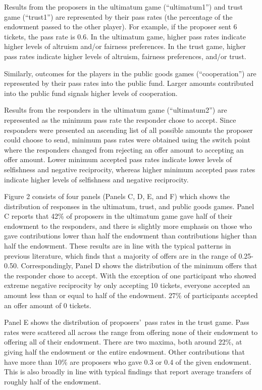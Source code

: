 \documentclass[12pt]{article}
\begin{document}
Results from the proposers in the ultimatum game (``ultimatum1'') and trust game (``trust1'') are represented by their pass rates (the percentage of the endowment passed to the other player). For example, if the proposer sent 6 tickets, the pass rate is 0.6. In the ultimatum game, higher pass rates indicate higher levels of altruism and/or fairness preferences. In the trust game, higher pass rates indicate higher levels of altruism, fairness preferences, and/or trust. 

Similarly, outcomes for the players in the public goods games (``cooperation'') are represented by their pass rates into the public fund. Larger amounts contributed into the public fund signals higher levels of cooperation.

Results from the responders in the ultimatum game (``ultimatum2'') are represented as the minimum pass rate the responder chose to accept. Since responders were presented an ascending list of all possible amounts the proposer could choose to send, minimum pass rates were obtained using the switch point where the responders changed from rejecting an offer amount to accepting an offer amount. Lower minimum accepted pass rates indicate lower levels of selfishness and negative reciprocity, whereas higher minimum accepted pass rates indicate higher levels of selfishness and negative reciprocity.

Figure 2 consists of four panels (Panels C, D, E, and F) which shows the distribution of responses in the ultimatum, trust, and public goods games. Panel C reports that 42\% of proposers in the ultimatum game gave half of their endowment to the responders, and there is slightly more emphasis on those who gave contributions lower than half the endowment than contributions higher than half the endowment. These results are in line with the typical patterns in previous literature, which finds that a majority of offers are in the range of 0.25-0.50. Correspondingly, Panel D shows the distribution of the minimum offers that the responder chose to accept. With the exception of one participant who showed extreme negative reciprocity by only accepting 10 tickets, everyone accepted an amount less than or equal to half of the endowment. 27\% of participants accepted an offer amount of 0 tickets. 

Panel E shows the distribution of proposers\rq \ pass rates in the trust game. Pass rates were scattered all across the range from offering none of their endowment to offering all of their endowment. There are two maxima, both around 22\%, at giving half the endowment or the entire endowment. Other contributions that have more than 10\% are proposers who gave 0.3 or 0.4 of the given endowment. This is also broadly in line with typical findings that report average transfers of roughly half of the endowment.
\end{document}
